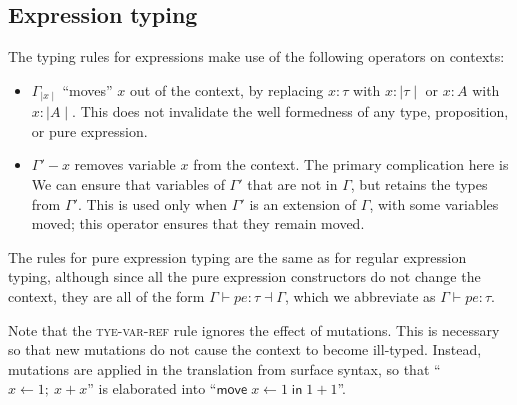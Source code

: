 \documentclass[acmsmall,nonacm]{acmart}
\newcommand{\core}[1]{{\mid}#1{\mid}}
\newcommand{\makes}{\dashv}
\begin{document}
\subsection{Expression typing}

The typing rules for expressions make use of the following operators on contexts:

\begin{itemize}
  \item $\Gamma_{\core x}$ ``moves'' $x$ out of the context, by replacing $x:\tau$ with $x:\core\tau$ or $x:A$ with $x:\core A$. This does not invalidate the well formedness of any type, proposition, or pure expression.

  \item $\Gamma'-x$ removes variable $x$ from the context. The primary complication here is We can ensure that variables of $\Gamma'$ that are not in $\Gamma$, but retains the types from $\Gamma'$. This is used only when $\Gamma'$ is an extension of $\Gamma$, with some variables moved; this operator ensures that they remain moved.

\end{itemize}

The rules for pure expression typing are the same as for regular expression typing, although since all the pure expression constructors do not change the context, they are all of the form $\Gamma\vdash pe:\tau\makes \Gamma$, which we abbreviate as $\Gamma\vdash pe:\tau$.

Note that the \textsc{tye-var-ref} rule ignores the effect of mutations. This is necessary so that new mutations do not cause the context to become ill-typed. Instead, mutations are applied in the translation from surface syntax, so that ``$x\gets 1;\ x+x$'' is elaborated into ``$\mathsf{move}\;x\gets 1\;\mathsf{in}\;1+1$''.
\end{document}
